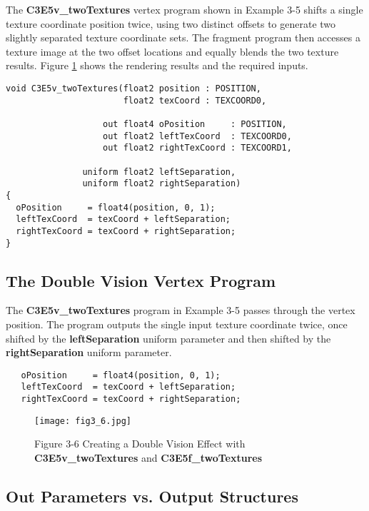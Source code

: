 \documentclass[../main.tex]{subfiles}
\begin{document}
The \textbf{C3E5v_twoTextures} vertex program shown in Example 3-5 shifts a single texture coordinate position twice, using two distinct offsets to generate two slightly separated texture coordinate sets. The fragment program then accesses a texture image at the two offset locations and equally blends the two texture results. Figure \ref{fig:3-6} shows the rendering results and the required inputs.

\FloatBarrier
\begin{lstlisting}[caption=Example 3-5. The \textbf{C3E5v_twoTextures} Vertex Program]
void C3E5v_twoTextures(float2 position : POSITION,
                       float2 texCoord : TEXCOORD0,

                   out float4 oPosition     : POSITION,
                   out float2 leftTexCoord  : TEXCOORD0,
                   out float2 rightTexCoord : TEXCOORD1,

               uniform float2 leftSeparation,
               uniform float2 rightSeparation)
{
  oPosition     = float4(position, 0, 1);
  leftTexCoord  = texCoord + leftSeparation;
  rightTexCoord = texCoord + rightSeparation;
}
\end{lstlisting}
\FloatBarrier

\subsection*{The Double Vision Vertex Program}

The \textbf{C3E5v_twoTextures} program in Example 3-5 passes through the vertex position. The program outputs the single input texture coordinate twice, once shifted by the \textbf{leftSeparation} uniform parameter and then shifted by the \textbf{rightSeparation} uniform parameter.

\FloatBarrier
\begin{lstlisting}
   oPosition     = float4(position, 0, 1);
   leftTexCoord  = texCoord + leftSeparation;
   rightTexCoord = texCoord + rightSeparation;
\end{lstlisting}
\FloatBarrier

\begin{figure}
    \centering
    \texttt{[image: fig3\_6.jpg]}
    \caption{Figure 3-6 Creating a Double Vision Effect with \textbf{C3E5v_twoTextures} and \textbf{C3E5f_twoTextures}}
    \label{fig:3-6}
\end{figure}

\subsection*{Out Parameters vs. Output Structures}
\end{document}
